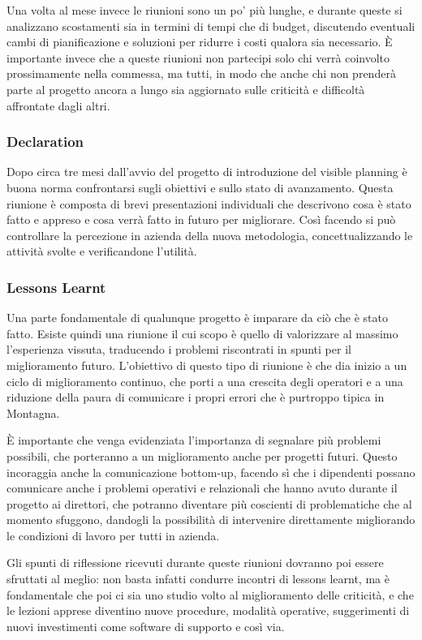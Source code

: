 \begin{multicols}{2}
	Una volta al mese invece le riunioni sono un po’ più lunghe, e durante queste si analizzano scostamenti sia in termini di tempi che di budget, discutendo eventuali cambi di pianificazione e soluzioni per ridurre i costi qualora sia necessario. È importante invece che a queste riunioni non partecipi solo chi verrà coinvolto prossimamente nella commessa, ma tutti, in modo che anche chi non prenderà parte al progetto ancora a lungo sia aggiornato sulle criticità e difficoltà affrontate dagli altri.

	\subsubsection{Declaration}
	Dopo circa tre mesi dall’avvio del progetto di introduzione del visible planning è buona norma confrontarsi sugli obiettivi e sullo stato di avanzamento. Questa riunione è composta di brevi presentazioni individuali che descrivono cosa è stato fatto e appreso e cosa verrà fatto in futuro per migliorare. Così facendo si può controllare la percezione in azienda della nuova metodologia, concettualizzando le attività svolte e verificandone l’utilità.

	\subsubsection{Lessons Learnt}
	Una parte fondamentale di qualunque progetto è imparare da ciò che è stato fatto. Esiste quindi una riunione il cui scopo è quello di valorizzare al massimo l’esperienza vissuta, traducendo i problemi riscontrati in spunti per il miglioramento futuro. L’obiettivo di questo tipo di riunione è che dia inizio a un ciclo di miglioramento continuo, che porti a una crescita degli operatori e a una riduzione della paura di comunicare i propri errori che è purtroppo tipica in Montagna.

	È importante che venga evidenziata l’importanza di segnalare più problemi possibili, che porteranno a un miglioramento anche per progetti futuri. Questo incoraggia anche la comunicazione bottom-up, facendo sì che i dipendenti possano comunicare anche i problemi operativi e relazionali che hanno avuto durante il progetto ai direttori, che potranno diventare più coscienti di problematiche che al momento sfuggono, dandogli la possibilità di intervenire direttamente migliorando le condizioni di lavoro per tutti in azienda.

	Gli spunti di riflessione ricevuti durante queste riunioni dovranno poi essere sfruttati al meglio: non basta infatti condurre incontri di lessons learnt, ma è fondamentale che poi ci sia uno studio volto al miglioramento delle criticità, e che le lezioni apprese diventino nuove procedure, modalità operative, suggerimenti di nuovi investimenti come software di supporto e così via.


\end{multicols}
